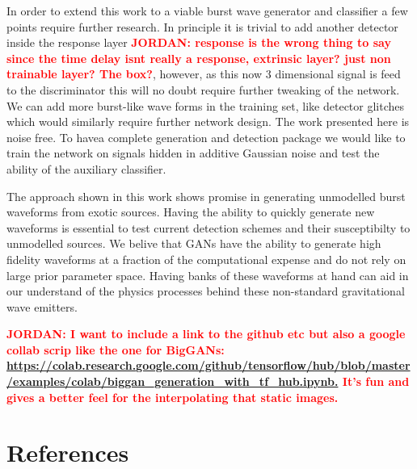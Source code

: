 \documentclass[12pt]{iopart}
\newcommand{\jordan}[1]{\textbf{\textcolor{red}{JORDAN: #1}}}
\begin{document}
In order to extend this work to a viable burst wave generator and classifier a few points require further research. In principle it is trivial to add another detector inside the response layer \jordan{response is the wrong thing to say since the time delay isnt really a response, extrinsic layer? just non trainable layer? The box?}, however, as this now 3 dimensional signal is feed to the discriminator this will no doubt require further tweaking of the network. We can add more burst-like wave forms in the training set, like detector glitches which would similarly require further network design. The work presented here is noise free. To havea complete generation and detection package we would like to train the network on signals hidden in additive Gaussian noise and test the ability of the auxiliary classifier. 

The approach shown in this work shows promise in generating unmodelled burst waveforms from exotic sources. Having the ability to quickly generate new waveforms is essential to test current detection schemes and their susceptibilty to unmodelled sources. We belive that GANs have the ability to generate high fidelity waveforms at a fraction of the computational expense and do not rely on large prior parameter space. Having banks of these waveforms at hand can aid in our understand of the physics processes behind these non-standard gravitational wave emitters.  

\jordan{I want to include a link to the github etc but also a google collab scrip like the one for BigGANs: \\
\url{https://colab.research.google.com/github/tensorflow/hub/blob/master/examples/colab/biggan_generation_with_tf_hub.ipynb.} 
It's fun and gives a better feel for the interpolating that static images.}

\section*{References}

\end{document}
